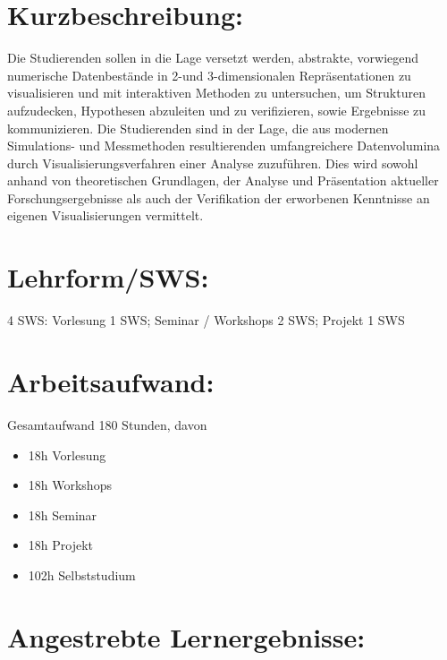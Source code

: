 \section*{Kurzbeschreibung:}\label{kurzbeschreibung-10}

Die Studierenden sollen in die Lage versetzt werden, abstrakte,
vorwiegend numerische Datenbestände in 2-und 3-dimensionalen
Repräsentationen zu visualisieren und mit interaktiven Methoden zu
untersuchen, um Strukturen aufzudecken, Hypothesen abzuleiten und zu
verifizieren, sowie Ergebnisse zu kommunizieren. Die Studierenden sind
in der Lage, die aus modernen Simulations- und Messmethoden
resultierenden umfangreichere Datenvolumina durch
Visualisierungsverfahren einer Analyse zuzuführen. Dies wird sowohl
anhand von theoretischen Grundlagen, der Analyse und Präsentation
aktueller Forschungsergebnisse als auch der Verifikation der erworbenen
Kenntnisse an eigenen Visualisierungen vermittelt.

\section*{Lehrform/SWS:}\label{lehrformsws-18}

4 SWS: Vorlesung 1 SWS; Seminar / Workshops 2 SWS; Projekt 1 SWS

\section*{Arbeitsaufwand:}\label{arbeitsaufwand-19}

Gesamtaufwand 180 Stunden, davon

\begin{itemize}
\tightlist
\item
  18h Vorlesung
\item
  18h Workshops
\item
  18h Seminar
\item
  18h Projekt
\item
  102h Selbststudium
\end{itemize}

\section*{Angestrebte
Lernergebnisse:}\label{angestrebte-lernergebnisse-18}

